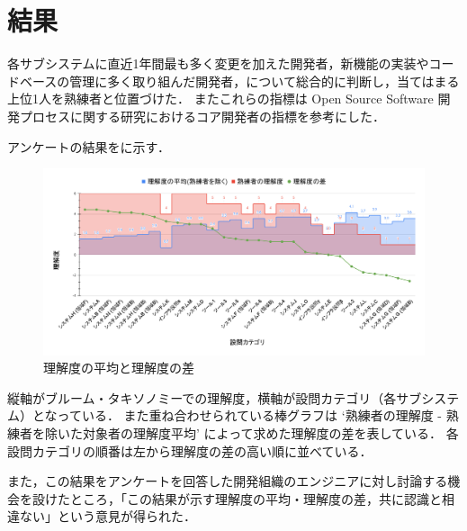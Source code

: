 \section{結果}
各サブシステムに直近1年間最も多く変更を加えた開発者，新機能の実装やコードベースの管理に多く取り組んだ開発者，について総合的に判断し，当てはまる上位1人を熟練者と位置づけた．
またこれらの指標は Open Source Software 開発プロセスに関する研究\cite{bib:mockus}におけるコア開発者の指標を参考にした．

アンケートの結果をに示す．

\begin{figure}[h]
	\centering
	\includegraphics[keepaspectratio,width=0.9\linewidth]{img/rikai.png}
	\caption{理解度の平均と理解度の差}
	\label{img:rikai}
\end{figure}

縦軸がブルーム・タキソノミーでの理解度，横軸が設問カテゴリ（各サブシステム）となっている．
また重ね合わせられている棒グラフは `熟練者の理解度 - 熟練者を除いた対象者の理解度平均' によって求めた理解度の差を表している．
各設問カテゴリの順番は左から理解度の差の高い順に並べている．

また，この結果をアンケートを回答した開発組織のエンジニアに対し討論する機会を設けたところ，「この結果が示す理解度の平均・理解度の差，共に認識と相違ない」という意見が得られた．
